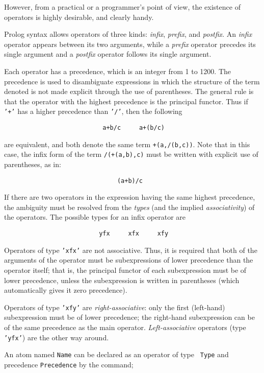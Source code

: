 However, from a practical or a programmer's point of view, the existence of
operators is highly desirable, and clearly handy.

Prolog syntax allows operators of three kinds: {\em infix}, {\em prefix}, and
{\em postfix}.  An {\em infix} operator appears between its two arguments,
while a {\em prefix} operator precedes its single argument and a {\em postfix}
operator follows its single argument.

Each operator has a precedence, which is an integer from 1 to 1200.  The
precedence is used to disambiguate expressions in which the structure of the
term denoted is not made explicit through the use of parentheses.  The
general rule is that the operator with the highest precedence is the
principal functor.  Thus if {\tt '+'} has a higher precedence than {\tt '/'},
then the following
\begin{verbatim}
                           a+b/c     a+(b/c)
\end{verbatim}
are equivalent, and both denote the same term {\tt +(a,/(b,c))}. Note that
in this case, the infix form of the term {\tt /(+(a,b),c)} must be written
with explicit use of parentheses, as in:
\begin{verbatim}
                               (a+b)/c
\end{verbatim}

If there are two operators in the expression having the same highest
precedence, the ambiguity must be resolved from the {\em types} (and 
the implied {\em associativity}) of the operators.  The possible types
for an infix operator are
\begin{verbatim}
                          yfx     xfx     xfy
\end{verbatim}
Operators of type {\tt 'xfx'} are not associative.  Thus, it is required that
both of the arguments of the operator must be subexpressions of lower
precedence than the operator itself; that is, the principal functor of each
subexpression must be of lower precedence, unless the subexpression is written
in parentheses (which automatically gives it zero precedence).

Operators of type {\tt 'xfy'} are {\em right-associative}:  only the
first (left-hand) subexpression must be of lower precedence; the right-hand
subexpression can be of the same precedence as the main operator.
{\em Left-associative} operators (type {\tt 'yfx'}) are the other way around.

An atom named {\tt Name} can be declared as an operator of type {\tt
Type} and precedence {\tt Precedence} by the command;

